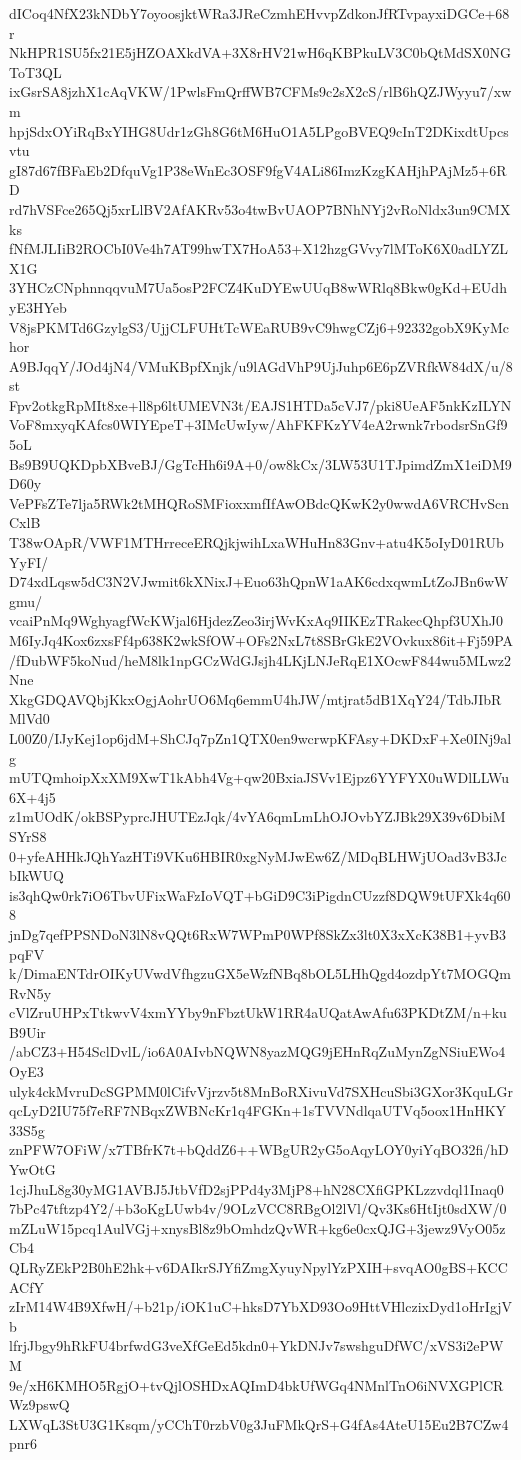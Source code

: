 dICoq4NfX23kNDbY7oyoosjktWRa3JReCzmhEHvvpZdkonJfRTvpayxiDGCe+68r
NkHPR1SU5fx21E5jHZOAXkdVA+3X8rHV21wH6qKBPkuLV3C0bQtMdSX0NGToT3QL
ixGsrSA8jzhX1cAqVKW/1PwlsFmQrffWB7CFMs9c2sX2cS/rlB6hQZJWyyu7/xwm
hpjSdxOYiRqBxYIHG8Udr1zGh8G6tM6HuO1A5LPgoBVEQ9cInT2DKixdtUpcsvtu
gI87d67fBFaEb2DfquVg1P38eWnEc3OSF9fgV4ALi86ImzKzgKAHjhPAjMz5+6RD
rd7hVSFce265Qj5xrLlBV2AfAKRv53o4twBvUAOP7BNhNYj2vRoNldx3un9CMXks
fNfMJLIiB2ROCbI0Ve4h7AT99hwTX7HoA53+X12hzgGVvy7lMToK6X0adLYZLX1G
3YHCzCNphnnqqvuM7Ua5osP2FCZ4KuDYEwUUqB8wWRlq8Bkw0gKd+EUdhyE3HYeb
V8jsPKMTd6GzylgS3/UjjCLFUHtTcWEaRUB9vC9hwgCZj6+92332gobX9KyMchor
A9BJqqY/JOd4jN4/VMuKBpfXnjk/u9lAGdVhP9UjJuhp6E6pZVRfkW84dX/u/8st
Fpv2otkgRpMIt8xe+ll8p6ltUMEVN3t/EAJS1HTDa5cVJ7/pki8UeAF5nkKzILYN
VoF8mxyqKAfcs0WIYEpeT+3IMcUwIyw/AhFKFKzYV4eA2rwnk7rbodsrSnGf95oL
Bs9B9UQKDpbXBveBJ/GgTcHh6i9A+0/ow8kCx/3LW53U1TJpimdZmX1eiDM9D60y
VePFsZTe7lja5RWk2tMHQRoSMFioxxmfIfAwOBdcQKwK2y0wwdA6VRCHvScnCxlB
T38wOApR/VWF1MTHrreceERQjkjwihLxaWHuHn83Gnv+atu4K5oIyD01RUbYyFI/
D74xdLqsw5dC3N2VJwmit6kXNixJ+Euo63hQpnW1aAK6cdxqwmLtZoJBn6wWgmu/
vcaiPnMq9WghyagfWcKWjal6HjdezZeo3irjWvKxAq9IIKEzTRakecQhpf3UXhJ0
M6IyJq4Kox6zxsFf4p638K2wkSfOW+OFs2NxL7t8SBrGkE2VOvkux86it+Fj59PA
/fDubWF5koNud/heM8lk1npGCzWdGJsjh4LKjLNJeRqE1XOcwF844wu5MLwz2Nne
XkgGDQAVQbjKkxOgjAohrUO6Mq6emmU4hJW/mtjrat5dB1XqY24/TdbJIbRMlVd0
L00Z0/IJyKej1op6jdM+ShCJq7pZn1QTX0en9wcrwpKFAsy+DKDxF+Xe0INj9alg
mUTQmhoipXxXM9XwT1kAbh4Vg+qw20BxiaJSVv1Ejpz6YYFYX0uWDlLLWu6X+4j5
z1mUOdK/okBSPyprcJHUTEzJqk/4vYA6qmLmLhOJOvbYZJBk29X39v6DbiMSYrS8
0+yfeAHHkJQhYazHTi9VKu6HBIR0xgNyMJwEw6Z/MDqBLHWjUOad3vB3JcbIkWUQ
is3qhQw0rk7iO6TbvUFixWaFzIoVQT+bGiD9C3iPigdnCUzzf8DQW9tUFXk4q608
jnDg7qefPPSNDoN3lN8vQQt6RxW7WPmP0WPf8SkZx3lt0X3xXcK38B1+yvB3pqFV
k/DimaENTdrOIKyUVwdVfhgzuGX5eWzfNBq8bOL5LHhQgd4ozdpYt7MOGQmRvN5y
cVlZruUHPxTtkwvV4xmYYby9nFbztUkW1RR4aUQatAwAfu63PKDtZM/n+kuB9Uir
/abCZ3+H54SclDvlL/io6A0AIvbNQWN8yazMQG9jEHnRqZuMynZgNSiuEWo4OyE3
ulyk4ckMvruDcSGPMM0lCifvVjrzv5t8MnBoRXivuVd7SXHcuSbi3GXor3KquLGr
qcLyD2IU75f7eRF7NBqxZWBNcKr1q4FGKn+1sTVVNdlqaUTVq5oox1HnHKY33S5g
znPFW7OFiW/x7TBfrK7t+bQddZ6++WBgUR2yG5oAqyLOY0yiYqBO32fi/hDYwOtG
1cjJhuL8g30yMG1AVBJ5JtbVfD2sjPPd4y3MjP8+hN28CXfiGPKLzzvdql1Inaq0
7bPc47tftzp4Y2/+b3oKgLUwb4v/9OLzVCC8RBgOl2lVl/Qv3Ks6HtIjt0sdXW/0
mZLuW15pcq1AulVGj+xnysBl8z9bOmhdzQvWR+kg6e0cxQJG+3jewz9VyO05zCb4
QLRyZEkP2B0hE2hk+v6DAIkrSJYfiZmgXyuyNpylYzPXIH+svqAO0gBS+KCCACfY
zIrM14W4B9XfwH/+b21p/iOK1uC+hksD7YbXD93Oo9HttVHlczixDyd1oHrIgjVb
lfrjJbgy9hRkFU4brfwdG3veXfGeEd5kdn0+YkDNJv7swshguDfWC/xVS3i2ePWM
9e/xH6KMHO5RgjO+tvQjlOSHDxAQImD4bkUfWGq4NMnlTnO6iNVXGPlCRWz9pswQ
LXWqL3StU3G1Ksqm/yCChT0rzbV0g3JuFMkQrS+G4fAs4AteU15Eu2B7CZw4pnr6
